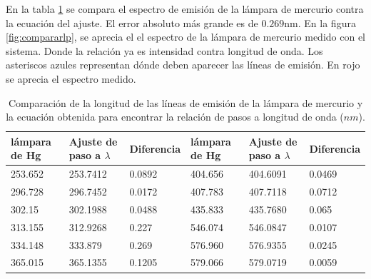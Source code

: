En la tabla \ref{tabla:comparaPasoL} se compara el espectro de emisión de la lámpara de mercurio contra la ecuación del ajuste. El error absoluto más grande es de $0.269$nm. En la figura \ref{fig:compararlp}, se aprecia el el espectro de la lámpara de mercurio medido con el sistema. Donde la relación ya es intensidad contra longitud de onda. Los asteriscos azules representan dónde deben aparecer las líneas de emisión. En rojo se aprecia el espectro medido.
   
\begin{table}[h]
	\centering 
	\caption{Comparación de la longitud de las líneas de emisión de la lámpara de mercurio y la ecuación obtenida para encontrar la relación de pasos a longitud de onda ($nm$).}
	\label{tabla:comparaPasoL}
	\begin{tabular}{|p{20mm}|p{20mm}|p{20mm}|p{20mm}|p{20mm}|p{20mm}|}
		\hline 
		 lámpara de Hg & Ajuste de paso a $\lambda$ & Diferencia  & lámpara de Hg & Ajuste de paso a $\lambda$ & Diferencia \\ 
		\hline 
		253.652 & 253.7412 & 0.0892 & 404.656 & 404.6091 & 0.0469 \\ 
		\hline 
		296.728 & 296.7452 & 0.0172 &407.783 & 407.7118 & 0.0712 \\ 
		\hline 
		302.15 & 302.1988 & 0.0488 &435.833 & 435.7680 & 0.065 \\ 
		\hline 
		313.155 & 312.9268 & 0.227 & 546.074 & 546.0847 & 0.0107  \\ 
		\hline 
		334.148 & 333.879 & 0.269 & 576.960 & 576.9355 & 0.0245  \\ 
		\hline 
		365.015 & 365.1355 & 0.1205 &  579.066 & 579.0719 & 0.0059\\ 
		\hline 
	\end{tabular} 
\end{table}


